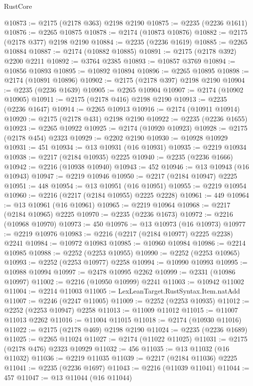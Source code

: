 \begin{lexlean}{RustCore}
\begin{coremodule}
@10873 := @2175 (@2178 @363) @2198 @2190
@10875 := @2235 (@2236 @1611)
@10876 := @2265 @10875
@10878 := @2174 (@10873 @10876)
@10882 := @2175 (@2178 @377) @2198 @2190
@10884 := @2235 (@2236 @1619)
@10885 := @2265 @10884
@10887 := @2174 (@10882 @10885)
@10891 := @2175 (@2178 @392) @2200 @2211
@10892 := @3764 @2385
@10893 := @10857 @3769
@10894 := @10856 @10893
@10895 := @10892 @10894
@10896 := @2265 @10895
@10898 := @2174 (@10891 @10896)
@10902 := @2175 (@2178 @397) @2198 @2190
@10904 := @2235 (@2236 @1639)
@10905 := @2265 @10904
@10907 := @2174 (@10902 @10905)
@10911 := @2175 (@2178 @416) @2198 @2190
@10913 := @2235 (@2236 @1647)
@10914 := @2265 @10913
@10916 := @2174 (@10911 @10914)
@10920 := @2175 (@2178 @431) @2198 @2190
@10922 := @2235 (@2236 @1655)
@10923 := @2265 @10922
@10925 := @2174 (@10920 @10923)
@10928 := @2175 (@2178 @454) @2323
@10929 := @2202 @2190
@10930 := @10928 @10929
@10931 := 451
@10934 := @13 @10931 (@16 @10931)
@10935 := @2219 @10934
@10938 := @2217 (@2184 @10935) @2225
@10940 := @2235 (@2236 @1666)
@10942 := @2216 (@10938 @10940)
@10943 := 452
@10946 := @13 @10943 (@16 @10943)
@10947 := @2219 @10946
@10950 := @2217 (@2184 @10947) @2225
@10951 := 448
@10954 := @13 @10951 (@16 @10951)
@10955 := @2219 @10954
@10960 := @2216 (@2217 (@2184 @10955) @2225 @2228)
@10961 := 449
@10964 := @13 @10961 (@16 @10961)
@10965 := @2219 @10964
@10968 := @2217 (@2184 @10965) @2225
@10970 := @2235 (@2236 @1673)
@10972 := @2216 (@10968 @10970)
@10973 := 450
@10976 := @13 @10973 (@16 @10973)
@10977 := @2219 @10976
@10983 := @2216 (@2217 (@2184 @10977) @2225 @2238) @2241
@10984 := @10972 @10983
@10985 := @10960 @10984
@10986 := @2214 @10985
@10988 := @2252 (@2253 @10955)
@10990 := @2252 (@2253 @10965)
@10993 := @2252 (@2253 @10977) @2258
@10994 := @10990 @10993
@10995 := @10988 @10994
@10997 := @2478 @10995 @2262
@10999 := @2331 (@10986 @10997)
@11002 := @2216 (@10950 @10999) @2241
@11003 := @10942 @11002
@11004 := @2214 @11003
@11005 := LexLeanTarget.RustSyntax.Item.natAdd
@11007 := @2246 (@2247 @11005)
@11009 := @2252 (@2253 @10935)
@11012 := @2252 (@2253 @10947) @2258
@11013 := @11009 @11012
@11015 := @11007 @11013 @2262
@11016 := @11004 @11015
@11018 := @2174 (@10930 @11016)
@11022 := @2175 (@2178 @469) @2198 @2190
@11024 := @2235 (@2236 @1689)
@11025 := @2265 @11024
@11027 := @2174 (@11022 @11025)
@11031 := @2175 (@2178 @476) @2323 @10929
@11032 := 456
@11035 := @13 @11032 (@16 @11032)
@11036 := @2219 @11035
@11039 := @2217 (@2184 @11036) @2225
@11041 := @2235 (@2236 @1697)
@11043 := @2216 (@11039 @11041)
@11044 := 457
@11047 := @13 @11044 (@16 @11044)

\end{coremodule}
\end{lexlean}
